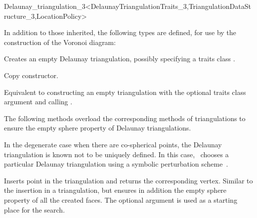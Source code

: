 \begin{ccRefClass}{Delaunay_triangulation_3<DelaunayTriangulationTraits_3,TriangulationDataStructure_3,LocationPolicy>}

\ccTypes

\ccThreeToTwo


In addition to those inherited, the following types are defined, for use by the
construction of the Voronoi diagram:

\ccGlue
{}
\ccGlue
{}
\ccGlue
{}

\ccCreation
{}

{Creates an empty Delaunay triangulation, possibly specifying a traits class
.}

{Copy constructor.}

{Equivalent to constructing an empty triangulation with the optional 
traits class argument and calling .}

\ccOperations


The following methods overload the corresponding methods of
triangulations to ensure the empty sphere property of Delaunay 
triangulations.

In the degenerate case when there are co-spherical points, the Delaunay
triangulation is known not to be uniquely defined. In this case, \cgal\ 
chooses a particular Delaunay triangulation using a symbolic perturbation
scheme~\cite{cgal:dt-pvr3d-03}.


{Inserts point \ccc{p} in the triangulation and returns the corresponding
 vertex. Similar to the insertion in a triangulation, but ensures in
addition the empty sphere property of all the created faces.
The optional argument  is used as a starting place for the search.}


\end{ccRefClass}
